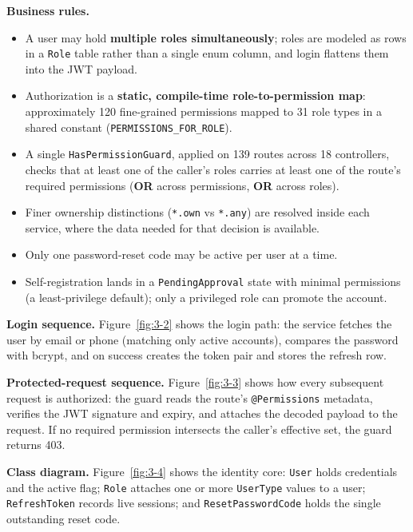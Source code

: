 \textbf{Business rules.}
\begin{itemize}
  \item A user may hold \textbf{multiple roles simultaneously}; roles are modeled as rows in a
    \texttt{Role} table rather than a single enum column, and login flattens them into the JWT
    payload.
  \item Authorization is a \textbf{static, compile-time role-to-permission map}: approximately
    120 fine-grained permissions mapped to 31 role types in a shared constant
    (\texttt{PERMISSIONS\_FOR\_ROLE}).
  \item A single \texttt{HasPermissionGuard}, applied on 139 routes across 18 controllers, checks
    that at least one of the caller's roles carries at least one of the route's required
    permissions (\textbf{OR} across permissions, \textbf{OR} across roles).
  \item Finer ownership distinctions (\texttt{*.own} vs \texttt{*.any}) are resolved inside each
    service, where the data needed for that decision is available.
  \item Only one password-reset code may be active per user at a time.
  \item Self-registration lands in a \texttt{PendingApproval} state with minimal permissions (a
    least-privilege default); only a privileged role can promote the account.
\end{itemize}

\textbf{Login sequence.} Figure~\ref{fig:3-2} shows the login path: the service fetches the user
by email or phone (matching only active accounts), compares the password with bcrypt, and on
success creates the token pair and stores the refresh row.


\textbf{Protected-request sequence.} Figure~\ref{fig:3-3} shows how every subsequent request is
authorized: the guard reads the route's \texttt{@Permissions} metadata, verifies the JWT
signature and expiry, and attaches the decoded payload to the request. If no required permission
intersects the caller's effective set, the guard returns 403.


\textbf{Class diagram.} Figure~\ref{fig:3-4} shows the identity core: \texttt{User} holds
credentials and the active flag; \texttt{Role} attaches one or more \texttt{UserType} values to a
user; \texttt{RefreshToken} records live sessions; and \texttt{ResetPasswordCode} holds the single
outstanding reset code.

